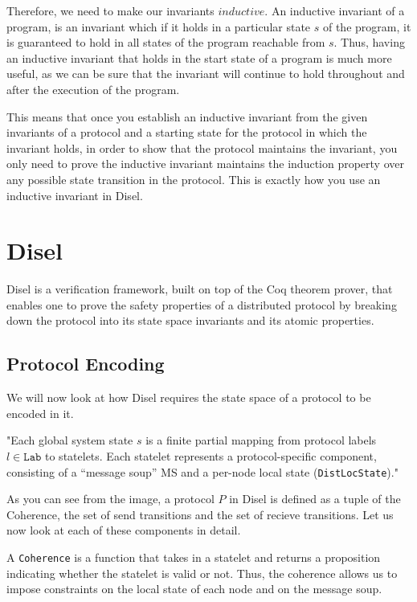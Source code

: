 Therefore, we need to make our invariants $inductive$. An inductive invariant
of a program, is an invariant which if it holds in a particular state $s$ of the
program, it is guaranteed to hold in all states of the program reachable from $s$.
Thus, having an inductive invariant that holds in the start state of a program
is much more useful, as we can be sure that the invariant will continue to
hold throughout and after the execution of the program.

This means that once you establish an inductive invariant from the given invariants
of a protocol and a starting state for the protocol in which the invariant holds,
in order to show that the protocol maintains the invariant, you only need to
prove the inductive invariant maintains the induction property over any possible state
transition in the protocol. This is exactly how you use an inductive invariant in
Disel.


\section{Disel}
Disel is a verification framework, built on top of the Coq theorem prover,
that enables one to prove the safety properties of a distributed protocol by
breaking down the protocol into its state space invariants and its atomic properties.

\subsection{Protocol Encoding}
We will now look at how Disel requires the state space of a protocol to be encoded in it.

"Each global system state $s$ is a finite partial mapping from protocol labels
$l \in \mathrm{\texttt{Lab}}$ to statelets. Each statelet represents a
protocol-specific component, consisting of a “message soup” MS and a per-node
local state (\texttt{DistLocState})."


As you can see from the image, a protocol $P$ in Disel is defined as a tuple
of the Coherence, the set of send transitions and the set of recieve transitions.
Let us now look at each of these components in detail.

A \texttt{Coherence} is a function that takes in a statelet and returns a proposition
indicating whether the statelet is valid or not. Thus, the coherence allows us
to impose constraints on the local state of each node and on the message soup.

